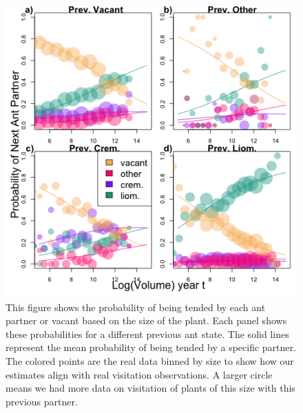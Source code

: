 \documentclass[11pt]{article}
\begin{document}
\begin{figure}[H]
	\includegraphics[width=0.95\linewidth]{Figures/transition.png}
	\caption{This figure shows the probability of being tended by each ant partner or vacant based on the size of the plant. Each panel shows these probabilities for a different previous ant state. The solid lines represent the mean probability of being tended by a specific partner. The colored points are the real data binned by size to show how our estimates align with real visitation observations. A larger circle means we had more data on visitation of plants of this size with this previous partner.}
	\label{fig:Ant_Transition}
\end{figure}
\end{document}

